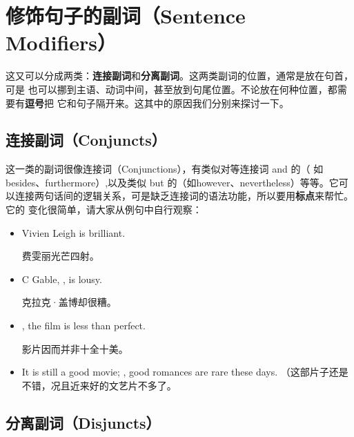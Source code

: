\section{修饰句子的副词（Sentence Modifiers）}

这又可以分成两类：\textbf{连接副词}和\textbf{分离副词}。这两类副词的位置，通常是放在句首，可是
也可以挪到主语、动词中间，甚至放到句尾位置。不论放在何种位置，都需要有\textbf{逗号}把
它和句子隔开来。这其中的原因我们分别来探讨一下。

\subsection{连接副词（Conjuncts）}

这一类的副词很像连接词（Conjunctions），有类似对等连接词 and 的（
如besides、furthermore）,以及类似 but 的（如however、nevertheless）等等。它可
以连接两句话间的逻辑关系，可是缺乏连接词的语法功能，所以要用\textbf{标点}来帮忙。它的
变化很简单，请大家从例句中自行观察：

\begin{itemize}
\item Vivien Leigh is brilliant.

  费雯丽光芒四射。
\item C Gable, , is lousy.

  克拉克·盖博却很糟。
\item {}, the film is less than perfect.

  影片因而并非十全十美。
\item  It is still a good movie; , good romances are rare these days.
  （这部片子还是不错，况且近来好的文艺片不多了。
\end{itemize}

\subsection{分离副词（Disjuncts）}

